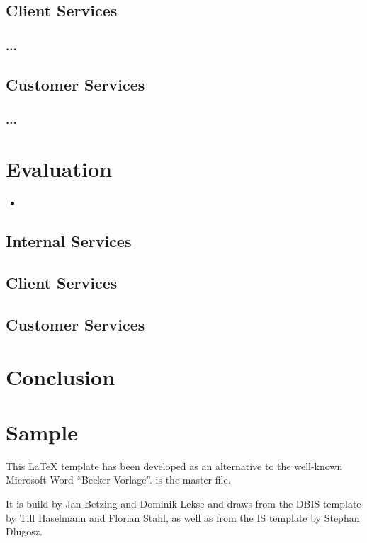 	\section{Client Services}
	\subsection{...}
	\section{Customer Services}
	\subsection{...}
\chapter{Evaluation}
	\begin{itemize}
		\item 
	\end{itemize}
	\section{Internal Services}
	\section{Client Services}
	\section{Customer Services}
\chapter{Conclusion}






\chapter{Sample}
This \LaTeX \- template has been developed as an alternative to the well-known Microsoft Word \enquote{Becker-Vorlage}.  is the master file.

It is build by  Jan Betzing and Dominik Lekse and draws from the DBIS template by Till Haselmann and Florian Stahl, as well as from the IS template by Stephan Dlugosz.

